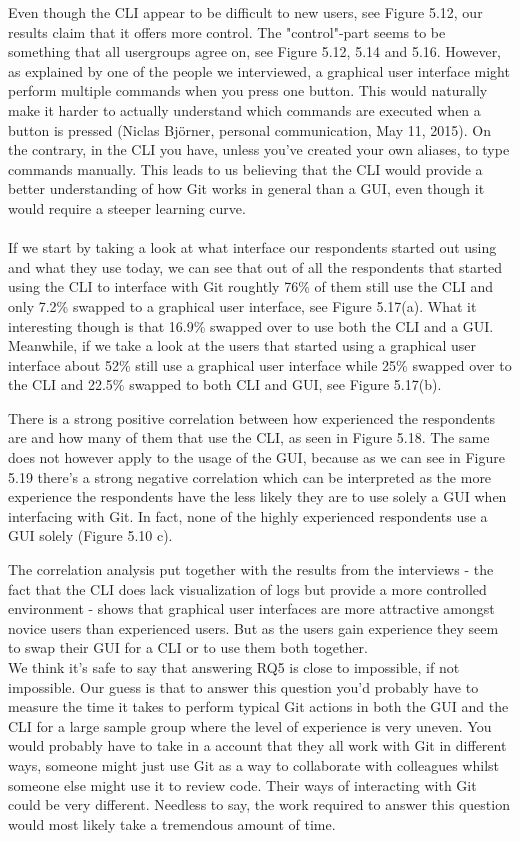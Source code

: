 \documentclass[a4paper,oneside]{bth} %
\begin{document}
				Even though the CLI appear to be difficult to new users, see Figure 5.12, our results claim that it offers more control. The "control"-part seems to be something that all usergroups agree on, see Figure 5.12, 5.14 and 5.16.
				However, as explained by one of the people we interviewed, a graphical user interface might perform multiple commands when you press one button. This would naturally make it harder to actually understand which commands are executed when a button is pressed (Niclas Björner, personal communication, May 11, 2015). %
				On the contrary, in the CLI you have, unless you've created your own aliases, to type commands manually.
				This leads to us believing that the CLI would provide a better understanding of how Git works in general than a GUI, even though it would require a steeper learning curve.
				\\\\
				If we start by taking a look at what interface our respondents started out using and what they use today, we can see that out of all the respondents that started using the CLI to interface with Git roughtly 76\% of them still use the CLI and only 7.2\% swapped to a graphical user interface, see Figure 5.17(a).
				What it interesting though is that 16.9\% swapped over to use both the CLI and a GUI.
				Meanwhile, if we take a look at the users that started using a graphical user interface about 52\% still use a graphical user interface while 25\% swapped over to the CLI and 22.5\% swapped to both CLI and GUI, see Figure 5.17(b).
				
				There is a strong positive correlation between how experienced the respondents are and how many of them that use the CLI, as seen in Figure 5.18.
				The same does not however apply to the usage of the GUI, because as we can see in Figure 5.19 there's a strong negative correlation which can be interpreted as the more experience the respondents have the less likely they are to use solely a GUI when interfacing with Git. In fact, none of the highly experienced respondents use a GUI solely (Figure 5.10 c).
				
				The correlation analysis put together with the results from the interviews - the fact that the CLI does lack visualization of logs but provide a more controlled environment - shows that graphical user interfaces are more attractive amongst novice users than experienced users.
				But as the users gain experience they seem to swap their GUI for a CLI or to use them both together.\\
				We think it's safe to say that answering RQ5 is close to impossible, if not impossible.
				Our guess is that to answer this question you'd probably have to measure the time it takes to perform typical Git actions in both the GUI and the CLI for a large sample group where the level of experience is very uneven. You would probably have to take in a account that they all work with Git in different ways, someone might just use Git as a way to collaborate with colleagues whilst someone else might use it to review code. Their ways of interacting with Git could be very different. Needless to say, the work required to answer this question would most likely take a tremendous amount of time.
				
\end{document}
